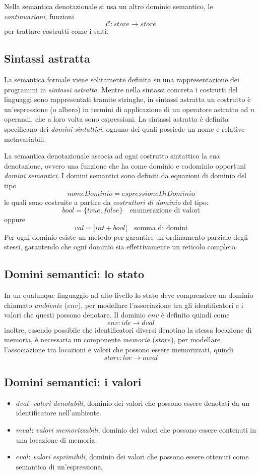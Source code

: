 \documentclass[a4paper, 10pt]{article}
\begin{document}
	Nella semantica denotazionale si usa un altro dominio semantico, le \textit{continuazioni}, funzioni 
	\[
	\mathcal{C}:store \to store
	\]
	per trattare costrutti come i salti.
	\subsection{Sintassi astratta}
	La semantica formale viene solitamente definita su una rappresentazione dei programmi in \textit{sintassi astratta}.
	Mentre nella sintassi concreta i costrutti del linguaggi sono rappresentati tramite stringhe, in sintassi astratta un costrutto è un'espressione (o albero) in termini di applicazione di un operatore astratto ad $n$ operandi, che a loro volta sono espressioni.
	La sintassi astratta è definita specificano dei \textit{domini sintattici}, ognuno dei quali possiede un nome e relative metavariabili.
	
	La semantica denotazionale associa ad ogni costrutto sintattico la sua denotazione, ovvero una funzione che ha come dominio e codominio opportuni \textit{domini semantici}.
	I domini semantici sono definiti da equazioni di dominio del tipo 
	\[
	nomeDominio = espressioneDiDominio
	\] 
	le quali sono costruite a partire da \textit{costruttori di dominio} del tipo:
	\[
	bool = \lbrace true, false \rbrace \quad \text{enumerazione di valori}
	\]
	oppure 
	\[
	val = \lbrack int + bool \rbrack \quad \text{somma di domini}
	\]
	Per ogni dominio esiste un metodo per garantire un ordinamento parziale degli stessi, garantendo che ogni dominio sia effettivamente un reticolo completo.
	
	\subsection{Domini semantici: lo stato}
	In un qualunque linguaggio ad alto livello lo stato deve comprendere un dominio chiamato \textit{ambiente} ($env$), per modellare l'associazione tra gli identificatori e i valori che questi possono denotare. Il dominio $env$ è definito quindi come $$env:ide \to dval$$ inoltre, essendo possibile che identificatori diversi denotino la stessa locazione di memoria, è necessaria un componente \textit{memoria} ($store$), per modellare l'associazione tra locazioni e valori che possono essere memorizzati, quindi 
	\[
	store:loc \to mval
	\]
	
	\subsection{Domini semantici: i valori}
	\begin{itemize}
		\item $dval$: \textit{valori denotabili}, dominio dei valori che possono essere denotati da un identificatore nell'ambiente.
		\item $mval$: \textit{valori memorizzabili}, dominio dei valori che possono essere contenuti in una locazione di memoria.
		\item $eval$: \textit{valori esprimibili}, dominio dei valori che possono essere ottenuti come semantica di un'espressione.
	\end{itemize}
	
\end{document}
